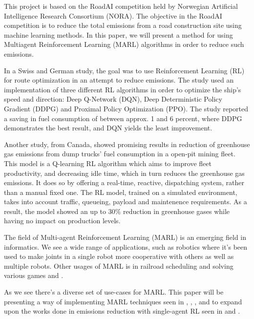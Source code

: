 \documentclass[conference]{IEEEtran}
\begin{document}
This project is based on the RoadAI competition held by Norwegian Artificial Intelligence Research
Consortium (NORA). \cite{noraRoadAIReducing} The objective in the RoadAI competition is to reduce the
total \coo{} emissions from a road construction site using machine learning methods. In this paper, we will
present a method for using Multiagent Reinforcement Learning (MARL) algorithms in order to reduce such
emissions.

In a Swiss and German study, the goal was to use Reinforcement Learning (RL) for route optimization in
an attempt to reduce \coo{}emissions. \cite{MORADI2022111882} The study used an implementation of three
different RL algorithms in order to optimize the ship's speed and direction: Deep Q-Network (DQN),
Deep Deterministic Policy Gradient (DDPG) and Proximal Policy Optimization (PPO). The study reported a
saving in fuel consumption of between approx. 1 and 6 percent, where DDPG demonstrates the best result,
and DQN yields the least improvement.

Another study, from Canada, \cite{HUO2023106664} showed promising results in reduction of greenhouse gas
emissions
from dump trucks' fuel consumption in a open-pit mining fleet. This model is a Q-learning RL algorithm
which aims to improve fleet productivity, and decreasing idle time, which in turn reduces the greenhouse
gas emissions. It does so by offering a real-time, reactive,  dispatching system, rather than a manual
fixed one. The RL model, trained on a simulated environment, takes into account traffic, queueing,
payload and maintenence requirements. As a result, the model showed an up to 30\% reduction in greenhouse
gases while having no impact on production levels.

The field of Multi-agent Reinforcement Learning (MARL) is an emerging field in informatics. We see a wide
range of applications, such as robotics where it's been used to make joints in a single robot more
cooperative with others \cite{Perrusquia_Yu_Li_2020} as well as multiple robots. \cite{Wang2022}
Other usages of MARL is in railroad scheduling \cite{laurent2021flatland} and solving various games
\cite{ellis2022smacv2} and \cite{yu2022surprising}.

As we see there's a diverse set of use-cases for MARL. This paper will be presenting a way of implementing
MARL techniques seen in \cite{Perrusquia_Yu_Li_2020}, \cite{Wang2022}, \cite{laurent2021flatland},
\cite{ellis2022smacv2} and \cite{yu2022surprising} to expand upon the works done in emissions reduction
with single-agent RL seen in \cite{HUO2023106664} and \cite{MORADI2022111882}.
\end{document}
